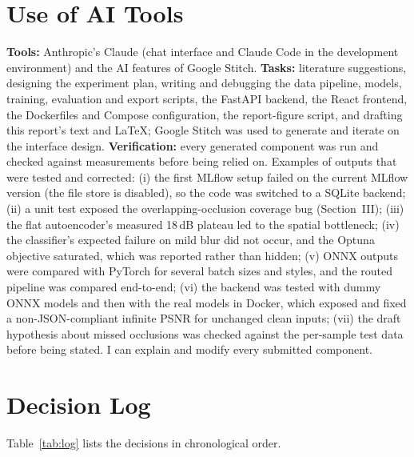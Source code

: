 \documentclass[conference]{IEEEtran}
\begin{document}
\section{Use of AI Tools}
\textbf{Tools:} Anthropic's Claude (chat interface and Claude Code in the development environment) and the AI features of Google Stitch. \textbf{Tasks:} literature suggestions, designing the experiment plan, writing and debugging the data pipeline, models, training, evaluation and export scripts, the FastAPI backend, the React frontend, the Dockerfiles and Compose configuration, the report-figure script, and drafting this report's text and \LaTeX; Google Stitch was used to generate and iterate on the interface design. \textbf{Verification:} every generated component was run and checked against measurements before being relied on. Examples of outputs that were tested and corrected: (i) the first MLflow setup failed on the current MLflow version (the file store is disabled), so the code was switched to a SQLite backend; (ii) a unit test exposed the overlapping-occlusion coverage bug (Section~III); (iii) the flat autoencoder's measured 18\,dB plateau led to the spatial bottleneck; (iv) the classifier's expected failure on mild blur did not occur, and the Optuna objective saturated, which was reported rather than hidden; (v) ONNX outputs were compared with PyTorch for several batch sizes and styles, and the routed pipeline was compared end-to-end; (vi) the backend was tested with dummy ONNX models and then with the real models in Docker, which exposed and fixed a non-JSON-compliant infinite PSNR for unchanged clean inputs; (vii) the draft hypothesis about missed occlusions was checked against the per-sample test data before being stated. I can explain and modify every submitted component.

\section{Decision Log}
Table~\ref{tab:log} lists the decisions in chronological order.
\end{document}
